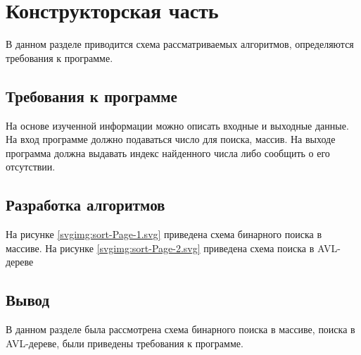 \chapter{Конструкторская часть}
В данном разделе приводится схема рассматриваемых алгоритмов, определяются требования к программе.

\section{Требования к программе}

На основе изученной информации можно описать входные и выходные данные.
На вход программе должно подаваться число для поиска, массив.
На выходе программа должна выдавать индекс найденного числа либо сообщить о его отсутствии.

\section{Разработка алгоритмов}

На рисунке \ref{svgimg:sort-Page-1.svg} приведена схема бинарного поиска в массиве.
На рисунке \ref{svgimg:sort-Page-2.svg} приведена схема поиска в AVL-дереве

\newpage
{}
\newpage
{}
\newpage

\section*{Вывод}
В данном разделе была рассмотрена схема бинарного поиска в массиве, поиска в AVL-дереве, были приведены требования к программе.

